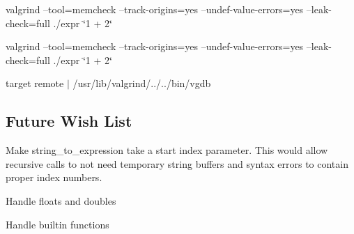 \begin{DoxyItemize}
\item valgrind --tool=memcheck --track-\/origins=yes --undef-\/value-\/errors=yes --leak-\/check=full ./expr \char`\"{}1 + 2\char`\"{}
\item valgrind --tool=memcheck --track-\/origins=yes --undef-\/value-\/errors=yes --leak-\/check=full ./expr \char`\"{}1 + 2\char`\"{}
\item target remote $\vert$ /usr/lib/valgrind/../../bin/vgdb
\end{DoxyItemize}\hypertarget{index_future_changes}{}\subsection{Future Wish List}\label{index_future_changes}

\begin{DoxyItemize}
\item Make string\+\_\+to\+\_\+expression take a start index parameter. This would allow recursive calls to not need temporary string buffers and syntax errors to contain proper index numbers.
\item Handle floats and doubles
\item Handle builtin functions 
\end{DoxyItemize}